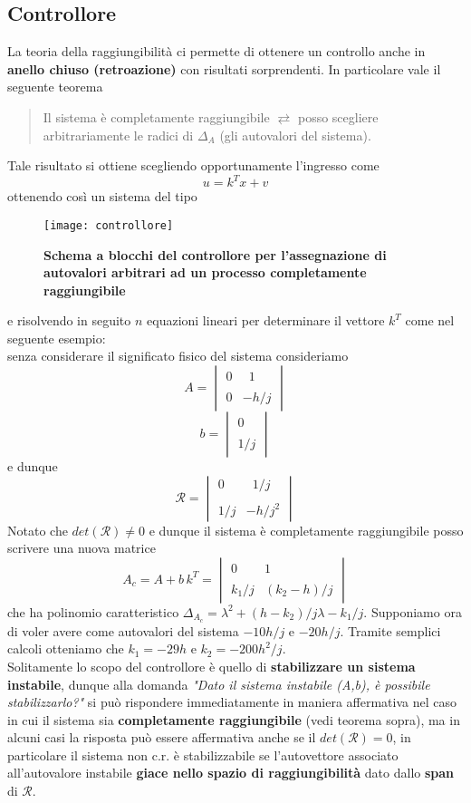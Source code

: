 \documentclass[a4paper]{article}
\begin{document}
	\subsection{Controllore}
	La teoria della raggiungibilità ci permette di ottenere un controllo anche in \textbf{anello chiuso (retroazione)} con risultati sorprendenti. In particolare vale il seguente teorema 
	\begin{quote}
		Il sistema è completamente raggiungibile $\rightleftarrows$ posso scegliere arbitrariamente le radici di $\Delta_A$ (gli autovalori del sistema).
	\end{quote} 
	Tale risultato si ottiene scegliendo opportunamente l'ingresso come \[u=k^Tx+v\] ottenendo così un sistema del tipo
	\begin{figure}[H]
		\centering
		\texttt{[image: controllore]}%
		\caption{\textbf{Schema a blocchi del controllore per l'assegnazione di autovalori arbitrari ad un processo completamente raggiungibile}}
	\end{figure}
	e risolvendo in seguito $n$ equazioni lineari per determinare il vettore $k^T$ come nel seguente esempio:\\
	senza considerare il significato fisico del sistema consideriamo 
		\[
	A=
	\begin{vmatrix}
	0 &  \,\,\,1 \\
	& \\
	0 &-h/j 					
	\end{vmatrix}
	\]
	\[
	b=
	\begin{vmatrix}
	0 \\
	\\
	1/j 					
	\end{vmatrix}
	\]
	 e dunque \[
	 \mathcal{R}=
	 \begin{vmatrix}
	 0 &  \,\,\,1/j \\
	 & \\
	 1/j &-h/j^2					
	 \end{vmatrix}
	 \]
	 Notato che $det(\mathcal{R})\ne0$ e dunque il sistema è completamente raggiungibile posso scrivere una nuova matrice 
	 \[
	 A_c=A+b\,k^T=\begin{vmatrix}
	 0 & 1 \\
	 &\\
	 k_1/j & (k_2-h)/j
	 \end{vmatrix}
	 \]
	che ha polinomio caratteristico $\Delta_{A_c}=\lambda^2+(h-k_2)/j\lambda-k_1/j$. Supponiamo ora di voler avere come autovalori del sistema $-10h/j$ e $-20h/j$. Tramite semplici calcoli otteniamo che $k_1=-29h$ e $k_2=-200h^2/j$.
	\newline \\
	Solitamente lo scopo del  controllore è quello di \textbf{stabilizzare un sistema instabile}, dunque alla domanda \emph{"Dato il sistema instabile (A,b), è possibile stabilizzarlo?"} si può rispondere immediatamente in maniera affermativa nel caso in cui il sistema sia \textbf{completamente raggiungibile} (vedi teorema sopra), ma in alcuni casi la risposta può essere affermativa anche se il $det(\mathcal{R})=0$, in particolare il sistema non c.r. è stabilizzabile se l'autovettore associato all'autovalore instabile \textbf{giace nello spazio di raggiungibilità} dato dallo \textbf{span} di $\mathcal{R}$.
	
\end{document}
